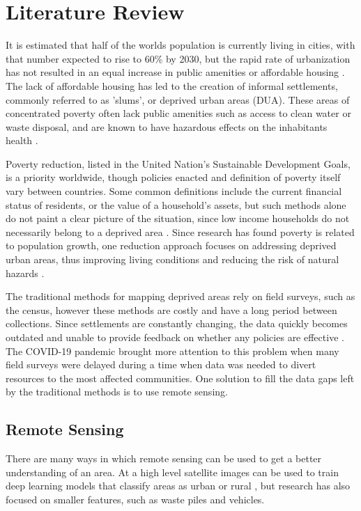 \documentclass[conference]{IEEEtran}
\begin{document}
	\section{Literature Review}
		It is estimated that half of the worlds population is currently living in cities, with that number expected to rise to 60\% by 2030, but the rapid rate of urbanization has not resulted in an equal increase in public amenities or affordable housing \cite{UN_Sustanability_Report}.
		The lack of affordable housing has led to the creation of informal settlements, commonly referred to as 'slums', or deprived urban areas (DUA).
		These areas of concentrated poverty often lack public amenities such as access to clean water or waste disposal, and are known to have hazardous effects on the inhabitants health \cite{Georgano_Stefanos_2021}.
		
		Poverty reduction, listed in the United Nation's Sustainable Development Goals, is a priority worldwide, though policies enacted and definition of poverty itself vary between countries.
		Some common definitions include the current financial status of residents, or the value of a household's assets, but such methods alone do not paint a clear picture of the situation, since low income households do not necessarily belong to a deprived area \cite{Merodio_Paloma_2021}. 
		Since research has found poverty is related to population growth, one reduction approach focuses on addressing deprived urban areas, thus improving living conditions and reducing the risk of natural hazards \cite{Lin_Li_2021}.
		
		The traditional methods for mapping deprived areas rely on field surveys, such as the census, however these methods are costly and have a long period between collections.
		Since settlements are constantly changing, the data quickly becomes outdated and unable to provide feedback on whether any policies are effective \cite{Williams_Trecia_2020}.
		The COVID-19 pandemic brought more attention to this problem when many field surveys were delayed during a time when data was needed to divert resources to the most affected communities.
		One solution to fill the data gaps left by the traditional methods is to use remote sensing.
		
	\subsection{Remote Sensing}
		There are many ways in which remote sensing can be used to get a better understanding of an area.
		At a high level satellite images can be used to train deep learning models that classify areas as urban or rural \cite{Guo_Jinxin_2019}, but research has also focused on smaller features, such as waste piles and vehicles.
		
\end{document}
